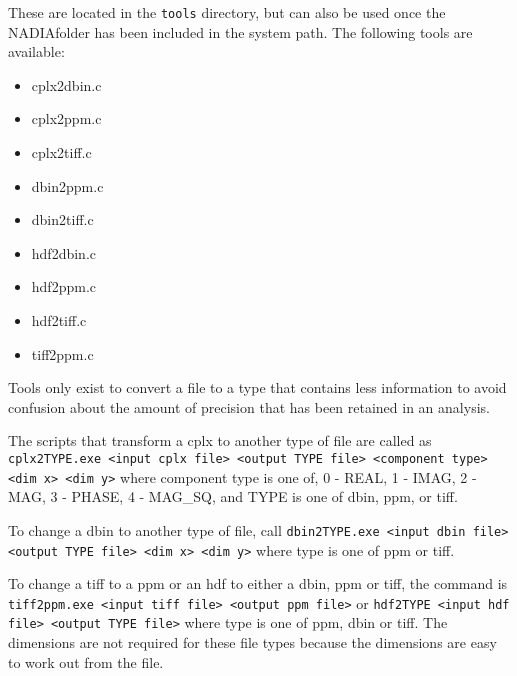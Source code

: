 \documentclass[]{nadia}
\def\name{NADIA}
\begin{document}
These are located in the {\tt tools} directory, but can also be used once the \name folder has been included in the system path. The following tools are available:

\begin{itemize}
\item cplx2dbin.c
\item cplx2ppm.c
\item cplx2tiff.c
\item dbin2ppm.c
\item dbin2tiff.c
\item hdf2dbin.c
\item hdf2ppm.c
\item hdf2tiff.c
\item tiff2ppm.c
\end{itemize}

Tools only exist to convert a file to a type that contains less information to avoid confusion about the amount of precision that has been retained in an analysis.

The scripts that transform a cplx to another type of file are called as {\tt cplx2TYPE.exe <input cplx file> <output TYPE file> <component type> <dim x> <dim y>} where component type is one of, 0 - REAL, 1 - IMAG, 2 - MAG, 3 - PHASE, 4 - MAG{\_}SQ, and TYPE is one of dbin, ppm, or tiff.

To change a dbin to another type of file, call {\tt dbin2TYPE.exe <input dbin file> <output TYPE file> <dim x> <dim y>} where type is one of ppm or tiff.

To change a tiff to a ppm or an hdf to either a dbin, ppm or tiff, the command is {\tt tiff2ppm.exe <input tiff file> <output ppm file>} or {\tt hdf2TYPE <input hdf file> <output TYPE file>} where type is one of ppm, dbin or tiff. The dimensions are not required for these file types because the dimensions are easy to work out from the file.

\end{document}
